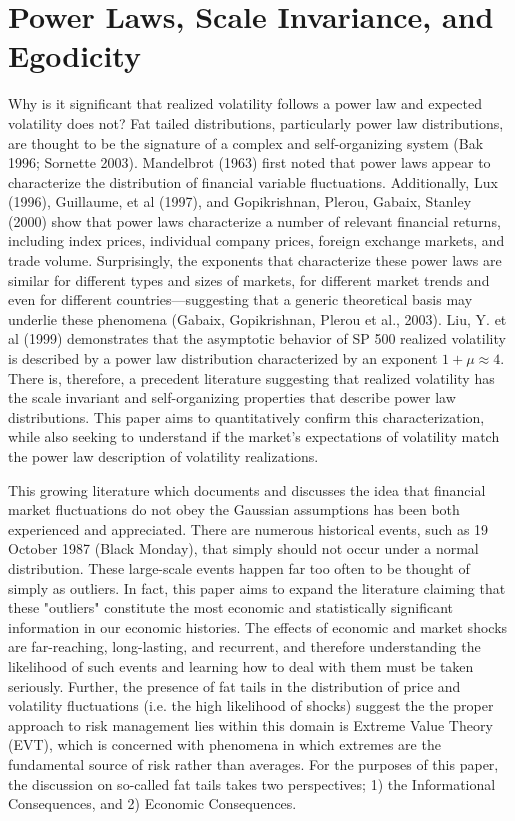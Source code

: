 \documentclass[11pt,a4paper,oldfontcommands]{memoir}
\begin{document}
{\section{Power Laws, Scale Invariance, and Egodicity}

Why is it significant that realized volatility follows a power law and expected volatility does not? Fat tailed distributions, particularly power law distributions, are thought to be the signature of a complex and self-organizing system (Bak 1996; Sornette 2003). Mandelbrot (1963) first noted that power laws appear to characterize the distribution of financial variable fluctuations. Additionally, Lux (1996), Guillaume, et al (1997), and Gopikrishnan, Plerou, Gabaix, Stanley (2000) show that power laws characterize a number of relevant financial returns, including index prices, individual company prices, foreign exchange markets, and trade volume. Surprisingly, the exponents that characterize these power laws are similar for different types and sizes of markets, for different market trends and even for different countries—suggesting that a generic theoretical basis may underlie these phenomena (Gabaix, Gopikrishnan, Plerou et al., 2003). Liu, Y. et al (1999) demonstrates that the asymptotic behavior of SP 500 realized volatility is described by a power law distribution characterized by an exponent $1 + \mu \approx 4$. There is, therefore, a precedent literature suggesting that realized volatility has the scale invariant and self-organizing properties that describe power law distributions. This paper aims to quantitatively confirm this characterization, while also seeking to understand if the market's expectations of volatility match the power law description of volatility realizations. 

This growing literature which documents and discusses the idea that financial market fluctuations do not obey the Gaussian assumptions has been both experienced and appreciated. There are numerous historical events, such as 19 October 1987 (Black Monday), that simply should not occur under a normal distribution. These large-scale events happen far too often to be thought of simply as outliers. In fact, this paper aims to expand the literature claiming that these "outliers" constitute the most economic and statistically significant information in our economic histories. The effects of economic and market shocks are far-reaching, long-lasting, and recurrent, and therefore understanding the likelihood of such events and learning how to deal with them must be taken seriously. Further, the presence of fat tails in the distribution of price and volatility fluctuations (i.e. the high likelihood of shocks) suggest the the proper approach to risk management lies within this domain is Extreme Value Theory (EVT), which is concerned with phenomena in which extremes are the fundamental source of risk rather than averages. For the purposes of this paper, the discussion on so-called fat tails takes two perspectives; 1) the Informational Consequences, and 2) Economic Consequences. 

}
\end{document}
